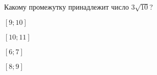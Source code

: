 \begin{ex}
	\begin{condition}
		Какому промежутку принадлежит число $3\sqrt{10}$?
		
		\selectanswer
		\begin{enumcols}[columns=4]
			\item $[9;10]$
			\item $[10;11]$
			\item $[6;7]$
			\item $[8;9]$
		\end{enumcols}
	\end{condition}
\end{ex}